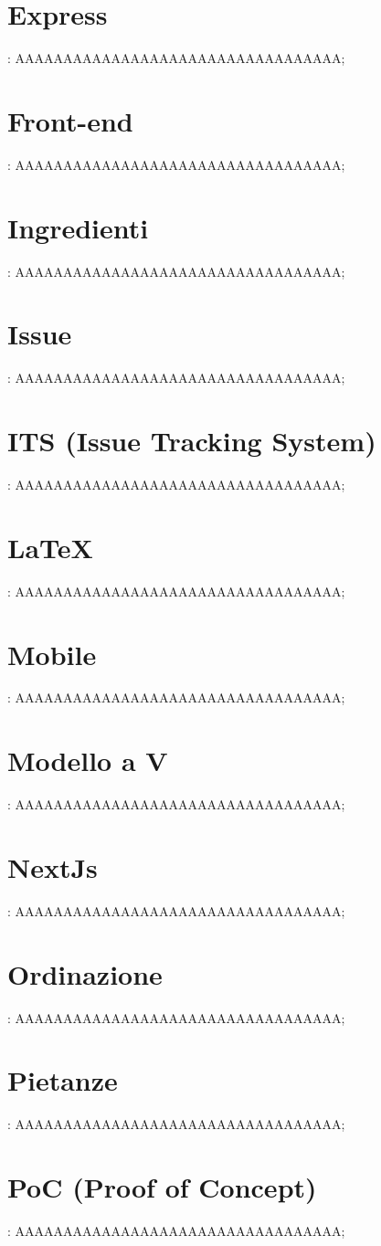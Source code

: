 \section{Express}: AAAAAAAAAAAAAAAAAAAAAAAAAAAAAAAAAA;
\section{Front-end}: AAAAAAAAAAAAAAAAAAAAAAAAAAAAAAAAAA;
\section{Ingredienti}: AAAAAAAAAAAAAAAAAAAAAAAAAAAAAAAAAA;
\section{Issue}: AAAAAAAAAAAAAAAAAAAAAAAAAAAAAAAAAA;
\section{ITS (Issue Tracking System)}: AAAAAAAAAAAAAAAAAAAAAAAAAAAAAAAAAA;
\section{LaTeX}: AAAAAAAAAAAAAAAAAAAAAAAAAAAAAAAAAA;
\section{Mobile}: AAAAAAAAAAAAAAAAAAAAAAAAAAAAAAAAAA;
\section{Modello a V}: AAAAAAAAAAAAAAAAAAAAAAAAAAAAAAAAAA;
\section{NextJs}: AAAAAAAAAAAAAAAAAAAAAAAAAAAAAAAAAA;
\section{Ordinazione}: AAAAAAAAAAAAAAAAAAAAAAAAAAAAAAAAAA;
\section{Pietanze}: AAAAAAAAAAAAAAAAAAAAAAAAAAAAAAAAAA;
\section{PoC (Proof of Concept)}: AAAAAAAAAAAAAAAAAAAAAAAAAAAAAAAAAA;
